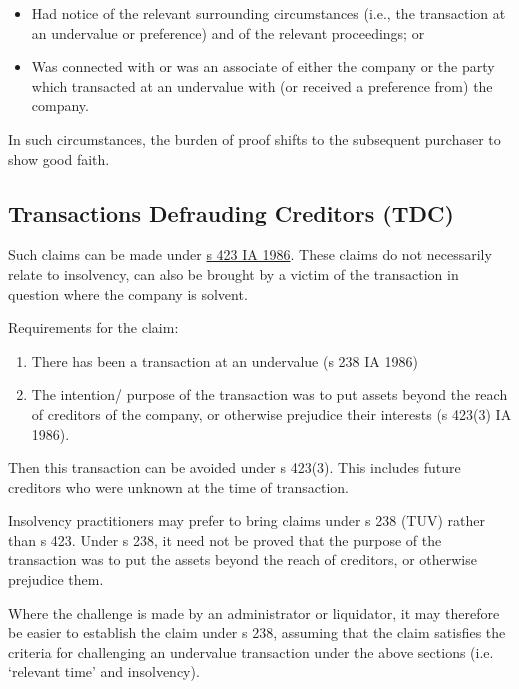 \documentclass[
]{article}
\providecommand{\tightlist}{%
  \setlength{\itemsep}{0pt}\setlength{\parskip}{0pt}}
\begin{document}
\begin{itemize}
\tightlist
\item
  Had notice of the relevant surrounding circumstances (i.e., the
  transaction at an undervalue or preference) and of the relevant
  proceedings; or
\item
  Was connected with or was an associate of either the company or the
  party which transacted at an undervalue with (or received a preference
  from) the company.
\end{itemize}

In such circumstances, the burden of proof shifts to the subsequent
purchaser to show good faith.

\hypertarget{transactions-defrauding-creditors-tdc}{%
\subsection{Transactions Defrauding Creditors
(TDC)}\label{transactions-defrauding-creditors-tdc}}

Such claims can be made under
\href{https://www.legislation.gov.uk/ukpga/1986/45/section/423}{s 423 IA
1986}. These claims do not necessarily relate to insolvency, can also be
brought by a victim of the transaction in question where the company is
solvent.

Requirements for the claim:

\begin{enumerate}
\tightlist
\item
  There has been a transaction at an undervalue (s 238 IA 1986)
\item
  The intention/ purpose of the transaction was to put assets beyond the
  reach of creditors of the company, or otherwise prejudice their
  interests (s 423(3) IA 1986).
\end{enumerate}

Then this transaction can be avoided under s 423(3). This includes
future creditors who were unknown at the time of transaction.

Insolvency practitioners may prefer to bring claims under s 238 (TUV)
rather than s 423. Under s 238, it need not be proved that the purpose
of the transaction was to put the assets beyond the reach of creditors,
or otherwise prejudice them.

Where the challenge is made by an administrator or liquidator, it may
therefore be easier to establish the claim under s 238, assuming that
the claim satisfies the criteria for challenging an undervalue
transaction under the above sections (i.e. `relevant time' and
insolvency).
\end{document}
